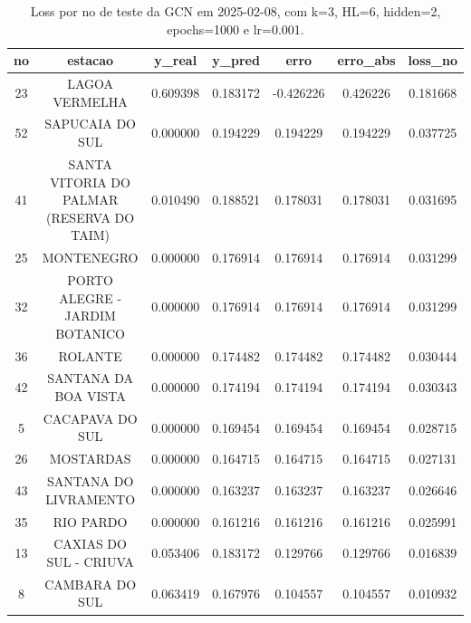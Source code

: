 \begin{table}[h]
\centering
\caption{Loss por no de teste da GCN em 2025-02-08, com k=3, HL=6, hidden=2, epochs=1000 e lr=0.001.}
\label{tab:gcn_loss_k3_hl6_h2_e1000_d20250208}
\begin{tabular}{ccccccc}
\toprule
no & estacao & y\_real & y\_pred & erro & erro\_abs & loss\_no \\
\midrule
23 & LAGOA VERMELHA & 0.609398 & 0.183172 & -0.426226 & 0.426226 & 0.181668 \\
52 & SAPUCAIA DO SUL & 0.000000 & 0.194229 & 0.194229 & 0.194229 & 0.037725 \\
41 & SANTA VITORIA DO PALMAR (RESERVA DO TAIM) & 0.010490 & 0.188521 & 0.178031 & 0.178031 & 0.031695 \\
25 & MONTENEGRO & 0.000000 & 0.176914 & 0.176914 & 0.176914 & 0.031299 \\
32 & PORTO ALEGRE - JARDIM BOTANICO & 0.000000 & 0.176914 & 0.176914 & 0.176914 & 0.031299 \\
36 & ROLANTE & 0.000000 & 0.174482 & 0.174482 & 0.174482 & 0.030444 \\
42 & SANTANA DA BOA VISTA & 0.000000 & 0.174194 & 0.174194 & 0.174194 & 0.030343 \\
5 & CACAPAVA DO SUL & 0.000000 & 0.169454 & 0.169454 & 0.169454 & 0.028715 \\
26 & MOSTARDAS & 0.000000 & 0.164715 & 0.164715 & 0.164715 & 0.027131 \\
43 & SANTANA DO LIVRAMENTO & 0.000000 & 0.163237 & 0.163237 & 0.163237 & 0.026646 \\
35 & RIO PARDO & 0.000000 & 0.161216 & 0.161216 & 0.161216 & 0.025991 \\
13 & CAXIAS DO SUL - CRIUVA & 0.053406 & 0.183172 & 0.129766 & 0.129766 & 0.016839 \\
8 & CAMBARA DO SUL & 0.063419 & 0.167976 & 0.104557 & 0.104557 & 0.010932 \\
\bottomrule
\end{tabular}
\end{table}

